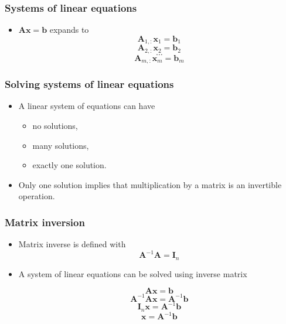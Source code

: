 \documentclass[notes]{beamer}          %
\newcommand{\vect}[1]{\bm{#1}}
\newif\iffull
\begin{document}
\begin{frame}
\frametitle{Systems of linear equations}
    \begin{itemize}
        \item $\vect{A}\vect{x} = \vect{b}$ expands to
            $$\vect{A}_{1,:} \vect{x}_1 = \vect{b}_1 $$
            $$\vect{A}_{2,:} \vect{x}_2 = \vect{b}_2 $$
            $$\ldots $$
            $$\vect{A}_{m,:} \vect{x}_m = \vect{b}_m $$
    \end{itemize}

\end{frame}




\begin{frame}
\frametitle{Solving systems of linear equations}
    \begin{itemize}
        \item A linear system of equations can have
            \begin{itemize}
                \item no solutions,
                \item many solutions,
                \item exactly one solution.
            \end{itemize}
        \item Only one solution implies that multiplication by a matrix is an invertible operation.
    \end{itemize}

\end{frame}

\begin{frame}
\frametitle{Matrix inversion}
    \begin{itemize}
        \item Matrix inverse is defined with
            $$ \vect{A}^{-1}\vect{A} = \vect{I}_n $$
        \item A system of linear equations can be solved using inverse matrix
        \begin{center}
            $$ \vect{A} \vect{x} = \vect{b} $$
            $$ \vect{A}^{-1}\vect{A} \vect{x} = \vect{A}^{-1}\vect{b} $$
            $$ \vect{I}_n \vect{x} = \vect{A}^{-1}\vect{b} $$
            $$ \vect{x} = \vect{A}^{-1}\vect{b} $$
        \end{center}
	\iffull
        \item This is useful mostly for abstract analysis.
        \item From a numerical point of view there are much more efficient methods.
        \fi
    \end{itemize}
\end{frame}
\end{document}
